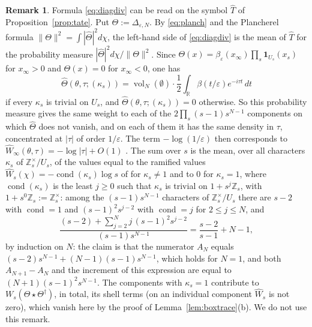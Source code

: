 \documentclass[11pt]{amsart}
\theoremstyle{definition}
\newtheorem*{remark}{Remark}
\newcommand{\R}{\mathbb R}
\newcommand{\Z}{\mathbb Z}
\newcommand{\vol}{\operatorname{vol}}
\begin{document}
\begin{remark}
Formula \eqref{eq:diagdiv} can be read on the symbol $\widehat T$ of
Proposition~\ref{prop:tate}. Put $\Theta:=\Delta_{\varepsilon,N}$. By
\eqref{eq:planch} and the Plancherel formula
$\|\Theta\|^2=\int|\widehat\Theta|^2d\chi$, the left-hand side of
\eqref{eq:diagdiv} is the mean of $\widehat T$ for the probability measure
$|\widehat\Theta|^2d\chi/\|\Theta\|^2$. Since
$\Theta(x)=\beta_\varepsilon(x_\infty)\prod_s\mathbf 1_{U_s}(x_s)$ for
$x_\infty>0$ and $\Theta(x)=0$ for $x_\infty<0$, one has
\[
  \widehat\Theta(\theta,\tau;(\kappa_s))
   =\vol_N(\emptyset)\cdot\frac12\int_\R\beta(t/\varepsilon)e^{-i\tau t}\,dt
\]
if every $\kappa_s$ is trivial on $U_s$, and
$\widehat\Theta(\theta,\tau;(\kappa_s))=0$ otherwise. So this probability
measure gives the same weight to each of the
$2\prod_s(s-1)s^{N-1}$ components on which $\widehat\Theta$ does not vanish,
and on each of them it has the same density in $\tau$, concentrated at
$|\tau|$ of order $1/\varepsilon$. The term $-\log(1/\varepsilon)$ then
corresponds to
$\widehat W_\infty(\theta,\tau)=-\log|\tau|+O(1)$ \cite[(46)]{Companion}.
The sum over $s$ is the mean, over all characters $\kappa_s$ of
$\Z_s^\times/U_s$, of the values equal to the ramified values
$\widehat W_s(\chi)=-\operatorname{cond}(\kappa_s)\log s$ of
\cite[(45)]{Companion} for $\kappa_s\ne1$ and to $0$ for $\kappa_s=1$, where $\operatorname{cond}(\kappa_s)$ is the least
$j\ge0$ such that $\kappa_s$ is trivial on $1+s^j\Z_s$, with
$1+s^0\Z_s:=\Z_s^\times$: among the $(s-1)s^{N-1}$ characters of
$\Z_s^\times/U_s$ there are $s-2$ with $\operatorname{cond}=1$ and
$(s-1)^2s^{j-2}$ with $\operatorname{cond}=j$ for $2\le j\le N$, and
\[
  \frac{(s-2)+\sum_{j=2}^Nj\,(s-1)^2s^{j-2}}{(s-1)s^{N-1}}
   =\frac{s-2}{s-1}+N-1 ,
\]
by induction on $N$: the claim is that the numerator $A_N$ equals
$(s-2)s^{N-1}+(N-1)(s-1)s^{N-1}$, which holds for $N=1$, and both
$A_{N+1}-A_N$ and the increment of this expression are equal to
$(N+1)(s-1)^2s^{N-1}$. The components with $\kappa_s=1$
contribute to $W_s(\Theta\star\Theta^\dagger)$, in total, its shell terms
(on an individual component $\widehat W_s$ is not zero), which vanish
here by the proof of Lemma~\ref{lem:boxtrace}(b). We do not use this remark.
\end{remark}
\end{document}
